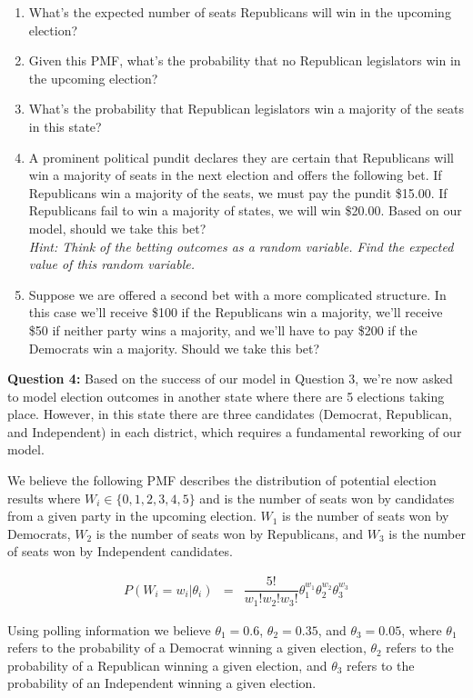 \documentclass[11pt]{article}
\begin{document}
\begin{enumerate}
\item What's the expected number of seats Republicans will win in the upcoming election? 
\item Given this PMF, what's the probability that no Republican legislators win in the upcoming election?
\item What's the probability that Republican legislators win a majority of the seats in this state?
\item A prominent political pundit declares they are certain that Republicans will win a majority of seats in the next election and offers the following bet. If Republicans win a majority of the seats, we must pay the pundit \$15.00. If Republicans fail to win a majority of states, we will win \$20.00. Based on our model, should we take this bet?\\
 \textit{Hint: Think of the betting outcomes as a random variable. Find the expected value of this random variable.}
\item Suppose we are offered a second bet with a more complicated structure. In this case we'll receive \$100 if the Republicans win a majority, we'll receive \$50 if neither party wins a majority, and we'll have to pay \$200 if the Democrats win a majority. Should we take this bet?
\end{enumerate}

\bigskip


\textbf{Question 4:}
Based on the success of our model in Question 3, we're now asked to model election outcomes in another state where there are 5 elections taking place. However, in this state there are three candidates (Democrat, Republican, and Independent) in each district, which requires a fundamental reworking of our model.

We believe the following PMF describes the distribution of potential election results where $W_i \in \{0,1,2,3,4,5\}$ and is the number of seats won by candidates from a given party in the upcoming election. $W_1$ is the number of seats won by Democrats, $W_2$ is the number of seats won by Republicans, and $W_3$ is the number of seats won by Independent candidates.

\begin{eqnarray*}
P(W_i = w_i | \theta_i) &=& \dfrac{5!}{w_1! w_2! w_3!} \theta_1^{w_1} \theta_2^{w_2} \theta_3^{w_3}
\end{eqnarray*}

Using polling information we believe $\theta_1 = 0.6$, $\theta_2 = 0.35$, and $\theta_3 = 0.05$, where $\theta_1$ refers to the probability of a Democrat winning a given election, $\theta_2$ refers to the probability of a Republican winning a given election, and $\theta_3$ refers to the probability of an Independent winning a given election.
\end{document}
